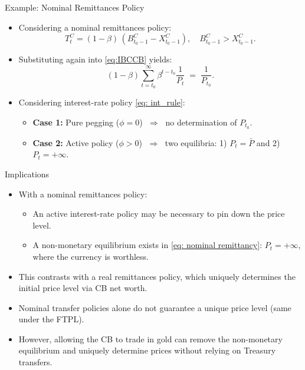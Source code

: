\documentclass[11pt,aspectratio=169]{beamer}
\begin{document}
\begin{frame}{Example: Nominal Remittances Policy}
\begin{itemize}
    \item Considering a nominal remittances policy:
    \[
      T_t^C = (1-\beta)\,(B_{t_0-1}^C - X_{t_0-1}^C), \quad B_{t_0-1}^C > X_{t_0-1}^C.
    \]
    \vspace{0.15cm}
    \item Substituting again into \eqref{eq:IBCCB} yields:
    \begin{equation} \label{eq: nominal remittancy}
      (1-\beta)\sum_{t=t_0}^\infty \beta^{t-t_0}\frac{1}{P_t} \;=\; \frac{1}{P_{t_0}}.
    \end{equation}
    \vspace{0.15cm}
    \item Considering interest-rate policy \eqref{eq: int_rule}:
    \begin{itemize}
        \item \textbf{Case 1:} Pure pegging ($\phi=0$) $\;\Rightarrow\;$ no determination of $P_{t_0}$.  
        \item \textbf{Case 2:} Active policy ($\phi>0$) $\;\Rightarrow\;$ two equilibria: 1) $P_t=\bar P$ and 2) $P_t=+\infty$.  
    \end{itemize}
\end{itemize}
\end{frame}

\begin{frame}{Implications}
\begin{itemize}
    \item With a nominal remittances policy:
    \vspace{0.15cm}
    \begin{itemize}
        \item An active interest-rate policy may be necessary to pin down the price level.
       \vspace{0.25cm} 
       \item A non-monetary equilibrium exists in \eqref{eq: nominal remittancy}: $P_t = +\infty$, where the currency is worthless.
    \end{itemize}
    \item This contrasts with a real remittances policy, which uniquely determines the initial price level via CB net worth.
       \vspace{0.25cm} 
    \item Nominal transfer policies alone do not guarantee a unique price level (same under the FTPL).
         \vspace{0.25cm} 
    \item However, allowing the CB to trade in gold can remove the non-monetary equilibrium and uniquely determine prices without relying on Treasury transfers.
\end{itemize}
\end{frame}
\end{document}
